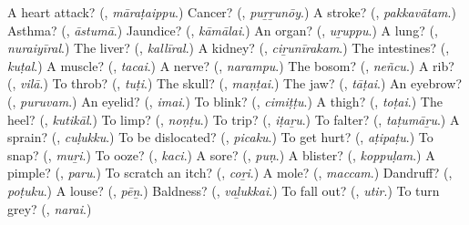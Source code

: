 \begin{tcolorbox}[breakable,colback=teal!4,colframe=teal!35!black,title={Before you move on}]
A heart attack? (\textbf{}, \emph{māraṭaippu}.) Cancer? (\textbf{}, \emph{puṟṟunōy}.) A stroke? (\textbf{}, \emph{pakkavātam}.) Asthma? (\textbf{}, \emph{āstumā}.) Jaundice? (\textbf{}, \emph{kāmālai}.) An organ? (\textbf{}, \emph{uṟuppu}.) A lung? (\textbf{}, \emph{nuraiyīral}.) The liver? (\textbf{}, \emph{kallīral}.) A kidney? (\textbf{}, \emph{ciṟunīrakam}.) The intestines? (\textbf{}, \emph{kuṭal}.) A muscle? (\textbf{}, \emph{tacai}.) A nerve? (\textbf{}, \emph{narampu}.) The bosom? (\textbf{}, \emph{neñcu}.) A rib? (\textbf{}, \emph{vilā}.) To throb? (\textbf{}, \emph{tuṭi}.) The skull? (\textbf{}, \emph{maṇṭai}.) The jaw? (\textbf{}, \emph{tāṭai}.) An eyebrow? (\textbf{}, \emph{puruvam}.) An eyelid? (\textbf{}, \emph{imai}.) To blink? (\textbf{}, \emph{cimiṭṭu}.) A thigh? (\textbf{}, \emph{toṭai}.) The heel? (\textbf{}, \emph{kutikāl}.) To limp? (\textbf{}, \emph{noṇṭu}.) To trip? (\textbf{}, \emph{iṭaṟu}.) To falter? (\textbf{}, \emph{taṭumāṟu}.) A sprain? (\textbf{}, \emph{cuḷukku}.) To be dislocated? (\textbf{}, \emph{picaku}.) To get hurt? (\textbf{}, \emph{aṭipaṭu}.) To snap? (\textbf{}, \emph{muṟi}.) To ooze? (\textbf{}, \emph{kaci}.) A sore? (\textbf{}, \emph{puṇ}.) A blister? (\textbf{}, \emph{koppuḷam}.) A pimple? (\textbf{}, \emph{paru}.) To scratch an itch? (\textbf{}, \emph{coṟi}.) A mole? (\textbf{}, \emph{maccam}.) Dandruff? (\textbf{}, \emph{poṭuku}.) A louse? (\textbf{}, \emph{pēṉ}.) Baldness? (\textbf{}, \emph{vaḻukkai}.) To fall out? (\textbf{}, \emph{utir}.) To turn grey? (\textbf{}, \emph{narai}.)
\end{tcolorbox}
